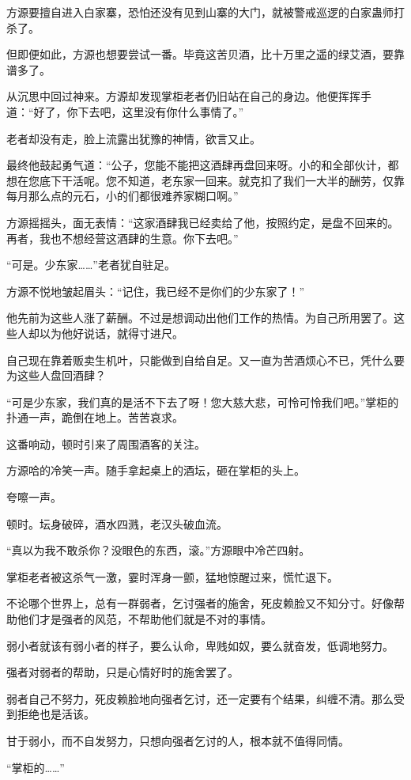 \begin{this_body}
方源要擅自进入白家寨，恐怕还没有见到山寨的大门，就被警戒巡逻的白家蛊师打杀了。

但即便如此，方源也想要尝试一番。毕竟这苦贝酒，比十万里之遥的绿艾酒，要靠谱多了。

从沉思中回过神来。方源却发现掌柜老者仍旧站在自己的身边。他便挥挥手道：“好了，你下去吧，这里没有你什么事情了。”

老者却没有走，脸上流露出犹豫的神情，欲言又止。

最终他鼓起勇气道：“公子，您能不能把这酒肆再盘回来呀。小的和全部伙计，都想在您底下干活呢。您不知道，老东家一回来。就克扣了我们一大半的酬劳，仅靠每月那么点的元石，小的们都很难养家糊口啊。”

方源摇摇头，面无表情：“这家酒肆我已经卖给了他，按照约定，是盘不回来的。再者，我也不想经营这酒肆的生意。你下去吧。”

“可是。少东家……”老者犹自驻足。

方源不悦地皱起眉头：“记住，我已经不是你们的少东家了！”

他先前为这些人涨了薪酬。不过是想调动出他们工作的热情。为自己所用罢了。这些人却以为他好说话，就得寸进尺。

自己现在靠着贩卖生机叶，只能做到自给自足。又一直为苦酒烦心不已，凭什么要为这些人盘回酒肆？

“可是少东家，我们真的是活不下去了呀！您大慈大悲，可怜可怜我们吧。”掌柜的扑通一声，跪倒在地上。苦苦哀求。

这番响动，顿时引来了周围酒客的关注。

方源哈的冷笑一声。随手拿起桌上的酒坛，砸在掌柜的头上。

夸嚓一声。

顿时。坛身破碎，酒水四溅，老汉头破血流。

“真以为我不敢杀你？没眼色的东西，滚。”方源眼中冷芒四射。

掌柜老者被这杀气一激，霎时浑身一颤，猛地惊醒过来，慌忙退下。

不论哪个世界上，总有一群弱者，乞讨强者的施舍，死皮赖脸又不知分寸。好像帮助他们才是强者的风范，不帮助他们就是不对的事情。

弱小者就该有弱小者的样子，要么认命，卑贱如奴，要么就奋发，低调地努力。

强者对弱者的帮助，只是心情好时的施舍罢了。

弱者自己不努力，死皮赖脸地向强者乞讨，还一定要有个结果，纠缠不清。那么受到拒绝也是活该。

甘于弱小，而不自发努力，只想向强者乞讨的人，根本就不值得同情。

“掌柜的……”


\end{this_body}
